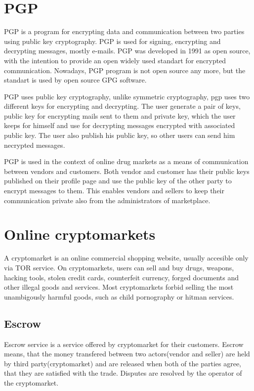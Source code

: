 \documentclass[
  digital, %
  table,   %
  lof,     %
  lot,     %
  oneside
]{fithesis3}
\begin{document}
\section{PGP}

PGP is a program for encrypting data and communication between two parties using public key cryptography.
PGP is used for signing, encrypting and decrypting messages, mostly e-mails.
PGP was developed in 1991 as open source, with the intention 
to provide an open widely used standart for encrypted communication.
Nowadays, PGP program is not open source any more, but the standart is used by open source GPG software.

PGP uses public key cryptography, unlike symmetric cryptography, pgp uses two different keys for encrypting and decrypting.
The user generate a pair of keys, public key for encrypting mails sent to them and private key, which the user
 keeps for himself and use for decrypting messages encrypted with associated public key. The user also publish his public
 key, so other users can send him necrypted messages.

PGP is used in the context of online drug markets as a means of communication between vendors and customers.
Both vendor and customer has their public keys published on their profile page and use the public key of the other
party to encrypt messages to them. This enables vendors and sellers to keep their communication private also 
from the administrators of marketplace.

\section{Online cryptomarkets}
A cryptomarket is an online commercial shopping website, usually accesible only via TOR service.
On cryptomarkets, users can sell and buy  drugs, weapons, hacking tools, stolen credit cards,
counterfeit currency, forged documents and other illegal goods and services.
Most cryptomarkets forbid selling the most unambigously harmful goods, such as
 child pornography or hitman services.

\subsection{Escrow}
Escrow service is a service offered by cryptomarket for their customers.
Escrow means, that the money transfered between two actors(vendor and seller) are held by third party(cryptomarket)
 and are released when both of the parties agree, that they are satisfied with the trade.
 Disputes are resolved by the operator of the cryptomarket.
\end{document}
